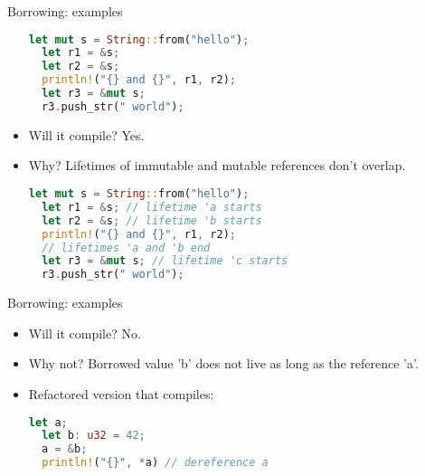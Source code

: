 \documentclass{beamer}
\begin{document}
\begin{frame}[fragile]{Borrowing: examples}
\begin{itemize}
  \begin{lstlisting}[language=Rust]
  let mut s = String::from("hello");
  let r1 = &s;
  let r2 = &s;
  println!("{} and {}", r1, r2);
  let r3 = &mut s;
  r3.push_str(" world");
  \end{lstlisting}

  \item Will it compile? \pause Yes.
  \item Why? \pause Lifetimes of immutable and mutable references don't overlap.

  \begin{lstlisting}[language=Rust]
  let mut s = String::from("hello");
  let r1 = &s; // lifetime 'a starts
  let r2 = &s; // lifetime 'b starts
  println!("{} and {}", r1, r2);
  // lifetimes 'a and 'b end
  let r3 = &mut s; // lifetime 'c starts
  r3.push_str(" world");
  \end{lstlisting}
\end{itemize}
\end{frame}


\begin{frame}[fragile]{Borrowing: examples}
\begin{itemize}
  \begin{lstlisting}[language=Rust]
  let mut s = String::from("hello");
  let b = &mut a;
  Vec::push(&mut v, 12);
  println!("{}", *b);
  \end{lstlisting}
  \pause

  \begin{lstlisting}[language=Rust]
  let mut v = vec![10, 11];
  Vec::push(&mut v, 12); // lifetime 'b starts and ends
  let vptr = &mut v[1];  // lifetime 'a starts
  println!("{}", *vptr); // lifetime 'a ends
  \end{lstlisting}

  \item Will it compile? \pause No.
  \item Why not? \pause Borrowed value 'b' does not live as long as the reference 'a'.
  \item Refactored version that compiles:\pause

  \begin{lstlisting}[language=Rust]
  let a;
  let b: u32 = 42;
  a = &b;
  println!("{}", *a) // dereference a
  \end{lstlisting}
\end{itemize}
\end{frame}
\end{document}
